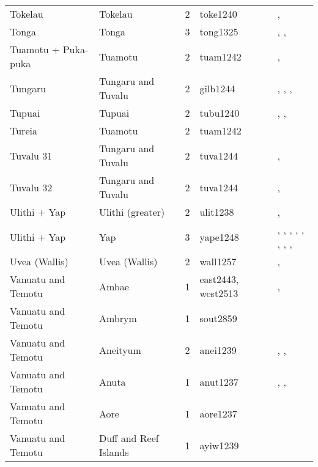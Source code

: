 \begin{longtable}{p{3cm}p{3cm}p{2cm}p{2cm}p{4cm}}
  Tokelau & Tokelau & 2 & toke1240 & \citet{hooper1973demographic}, \citet{macgregor1937} \\ 
  Tonga & Tonga & 3 & tong1325 & \citet{kirch1984evolution}, \citet{cummins1977tongan}, \citet{ferdon1988early} \\ 
  Tuamotu + Puka-puka & Tuamotu & 2 & tuam1242 & \citet{emory1975material}, \citet{emory1975material} \\ 
  Tungaru & Tungaru and Tuvalu & 2 & gilb1244 & \citet{lambert1966}, \citet{lambert1975makin}, \citet{lambert1991}, \citet{macdonald1982cinderellas} \\ 
  Tupuai & Tupuai & 2 & tubu1240 & \citet{aitken1930ethnology}, \citet{bollt2008excavations}, \citet{edwards2003archaeological} \\ 
  Tureia & Tuamotu & 2 & tuam1242 & \citet{emory1975material} \\ 
  Tuvalu 31 & Tungaru and Tuvalu & 2 & tuva1244 & \citet{macdonald1982cinderellas}, \citet{goldsmith1991} \\ 
  Tuvalu 32 & Tungaru and Tuvalu & 2 & tuva1244 & \citet{macdonald1982cinderellas}, \citet{goldsmith1991} \\ 
  Ulithi + Yap & Ulithi (greater) & 2 & ulit1238 & \citet{lessa1950}, \citet{lessa1966} \\ 
  Ulithi + Yap & Yap & 3 & yape1248 & \citet{huntetal1949}, \citet{muller1917}, \citet{murdocketal1944b}, \citet{salesius1906}, \citet{schneider1953}, \citet{schneider1957_yap}, \citet{schneider1962}, \citet{tetens_savages}, \citet{tetensandkubary1873} \\ 
  Uvea (Wallis) & Uvea (Wallis) & 2 & wall1257 & \citet{burrows1937}, \citet{pollock1995power} \\ 
  Vanuatu and Temotu & Ambae & 1 & east2443, west2513 & \citet{bonnemaison1972systeme}, \citet{bonnemaison1972systeme} \\ 
  Vanuatu and Temotu & Ambrym & 1 & sout2859 & \citet{tonkinson1981church} \\ 
  Vanuatu and Temotu & Aneityum & 2 & anei1239 & \citet{humphreys1926}, \citet{spriggs1982taro}, \citet{spriggs1986landscape} \\ 
  Vanuatu and Temotu & Anuta & 1 & anut1237 & \citet{feinberg1988socio}, \citet{feinberg1991}, \citet{kirch2002te} \\ 
  Vanuatu and Temotu & Aore & 1 & aore1237 & \citet{bonnemaison1996power} \\ 
  Vanuatu and Temotu & Duff and Reef Islands & 1 & ayiw1239 & \citet{davenport1969} \\ 

\end{longtable}
